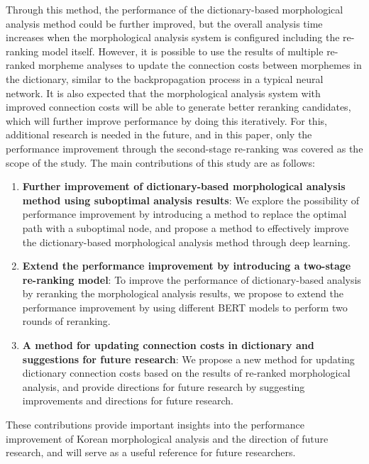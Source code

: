 \documentclass[AMS,STIX2COL]{WileyNJD-v2}
\begin{document}
    Through this method, the performance of the dictionary-based morphological analysis method could be further improved, but the overall analysis time increases when the morphological analysis system is configured including the re-ranking model itself.
    However, it is possible to use the results of multiple re-ranked morpheme analyses to update the connection costs between morphemes in the dictionary, similar to the backpropagation process in a typical neural network.
    It is also expected that the morphological analysis system with improved connection costs will be able to generate better reranking candidates, which will further improve performance by doing this iteratively.
    For this, additional research is needed in the future, and in this paper, only the performance improvement through the second-stage re-ranking was covered as the scope of the study.
    The main contributions of this study are as follows:
    \begin{enumerate}
        \item \textbf{Further improvement of dictionary-based morphological analysis method using suboptimal analysis results}: We explore the possibility of performance improvement by introducing a method to replace the optimal path with a suboptimal node, and propose a method to effectively improve the dictionary-based morphological analysis method through deep learning.
        \item \textbf{Extend the performance improvement by introducing a two-stage re-ranking model}: To improve the performance of dictionary-based analysis by reranking the morphological analysis results, we propose to extend the performance improvement by using different BERT models to perform two rounds of reranking.
        \item \textbf{A method for updating connection costs in dictionary and suggestions for future research}: We propose a new method for updating dictionary connection costs based on the results of re-ranked morphological analysis, and provide directions for future research by suggesting improvements and directions for future research.
    \end{enumerate}
    These contributions provide important insights into the performance improvement of Korean morphological analysis and the direction of future research, and will serve as a useful reference for future researchers.
\end{document}
